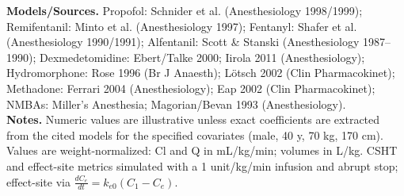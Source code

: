 \documentclass[11pt]{article}
\begin{document}
{\begin{longtable}{lrrrrrrrrrr}
%

\bottomrule
\end{longtable}
}

\vspace{4pt}
\footnotesize\textbf{Models/Sources.} Propofol: Schnider et al. (Anesthesiology 1998/1999); Remifentanil: Minto et al. (Anesthesiology 1997); Fentanyl: Shafer et al. (Anesthesiology 1990/1991); Alfentanil: Scott \& Stanski (Anesthesiology 1987--1990); Dexmedetomidine: Ebert/Talke 2000; Iirola 2011 (Anesthesiology); Hydromorphone: Rose 1996 (Br J Anaesth); Lötsch 2002 (Clin Pharmacokinet); Methadone: Ferrari 2004 (Anesthesiology); Eap 2002 (Clin Pharmacokinet); NMBAs: Miller's Anesthesia; Magorian/Bevan 1993 (Anesthesiology).\\
\footnotesize\textbf{Notes.} Numeric values are illustrative unless exact coefficients are extracted from the cited models for the specified covariates (male, 40 y, 70 kg, 170 cm). Values are weight-normalized: Cl and Q in mL/kg/min; volumes in L/kg. CSHT and effect-site metrics simulated with a 1 unit/kg/min infusion and abrupt stop; effect-site via $\tfrac{dC_e}{dt}=k_{e0}(C_1-C_e)$.
\end{document}
